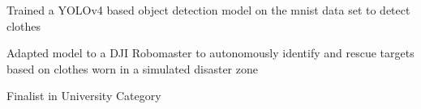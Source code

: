 \begin{cvitemize}
\item Trained a YOLOv4 based object detection model on the mnist data set to detect clothes
\item Adapted model to a DJI Robomaster to autonomously identify and rescue targets based on clothes worn in a simulated disaster zone
\item Finalist in University Category
\end{cvitemize}